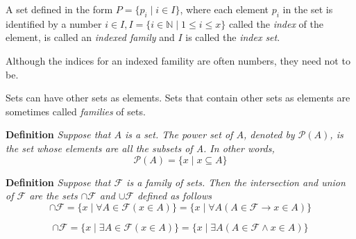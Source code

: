 A set defined in the form $P = \{p_i \mid i \in I\}$, where each element $p_i$ in the set is identified by a number $i \in I,  I=\{i \in \mathbb{N} \mid 1 \leq i \leq x \}$ called the \textit{index} of the element, is called an \textit{indexed family} and $I$ is called the \textit{index set}.

Although the indices for an indexed famility are often numbers, they need not to be.

Sets can have other sets as elements. Sets that contain other sets as elements are sometimes called \textit{families} of sets.

\textbf{Definition} \textit{Suppose that $A$ is a set. The power set of $A$, denoted by $\mathscr{P}(A)$, is the set whose elements are all the subsets of A. In other words, }
\[\mathscr{P}(A) = \{x \mid x \subseteq A\}\]

\textbf{Definition} \textit{Suppose that $\mathscr{F}$ is a family of sets. Then the intersection and union of $\mathscr{F}$ are the sets $\cap \mathscr{F}$ and $\cup \mathscr{F}$ defined as follows}
\[\cap \mathscr{F} = \{x \mid \forall A \in \mathscr{F} (x \in A)\} = \{x \mid \forall A (A \in \mathscr{F} \rightarrow x \in A)\}\]

\[\cap \mathscr{F} = \{x \mid \exists A \in \mathscr{F} (x \in A)\} = \{x \mid \exists A (A \in \mathscr{F} \land x \in A)\}\]